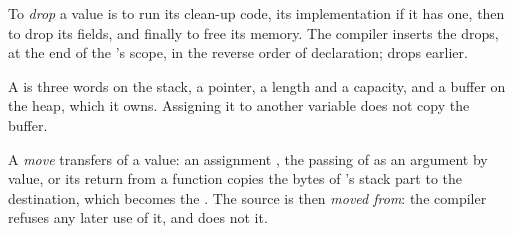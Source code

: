 \begin{definition}[Drop]\label{def:b2:rust-ownership:drop}
To \emph{drop} a value is to run its clean-up code, its  implementation if it has one,
then to drop its fields, and finally to free its memory. The compiler inserts the drops, at the end of the 's
scope, in the reverse order of declaration;  drops  earlier.
\end{definition}

A  is three words on the stack, a pointer, a length and a capacity, and a buffer on the heap, which it
owns. Assigning it to another variable does not copy the buffer.

\begin{definition}[Move]\label{def:b2:rust-ownership:move}
A \emph{move} transfers  of a value: an assignment , the passing of
 as an argument by value, or its return from a function copies the bytes of 's stack part to the
destination, which becomes the . The source is then \emph{moved from}: the compiler refuses any later use of
it, and does not  it.
\end{definition}

\label{lst:b2:rust-ownership:move}

\label{out:b2:rust-ownership:move}

